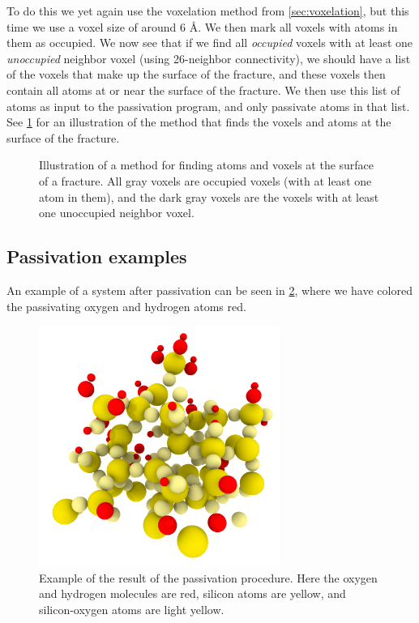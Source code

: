To do this we yet again use the voxelation method from \ref{sec:voxelation}, but this time we use a voxel size of around $6\text{ \AA}$. We then mark all voxels with atoms in them as occupied. We now see that if we find all \emph{occupied} voxels with at least one \emph{unoccupied} neighbor voxel (using 26-neighbor connectivity), we should have a list of the voxels that make up the surface of the fracture, and these voxels then contain all atoms at or near the surface of the fracture. We then use this list of atoms as input to the passivation program, and only passivate atoms in that list. See \cref{fig:find_surface_atoms} for an illustration of the method that finds the voxels and atoms at the surface of the fracture.
%
\begin{figure}[htpb]%
    \centering%
    \caption{%
        Illustration of a method for finding atoms and voxels at the surface of a fracture. All gray voxels are occupied voxels (with at least one atom in them), and the dark gray voxels are the voxels with at least one unoccupied neighbor voxel. %
    }%
    \label{fig:find_surface_atoms}%
\end{figure}%

\subsection{Passivation examples}
An example of a system after passivation can be seen in \cref{fig:passivation_example}, where we have colored the passivating oxygen and hydrogen atoms red.
%
\begin{figure}[htpb]%
    \centering%
    \includegraphics[width=0.7\textwidth]{images/passivation/passivation_example04.png}%
    \caption{
        Example of the result of the passivation procedure. Here the oxygen and hydrogen molecules are red, silicon atoms are yellow, and silicon-oxygen atoms are light yellow.%
    }%
    \label{fig:passivation_example}%
\end{figure}%

